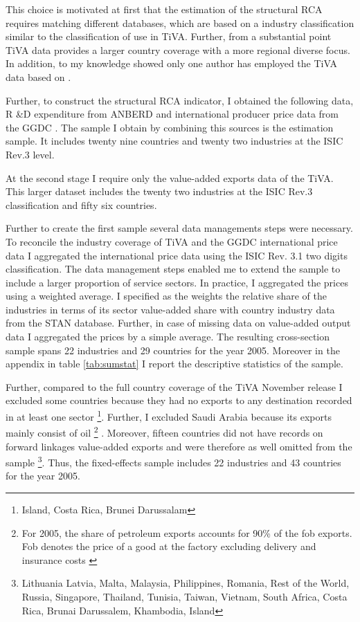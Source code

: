  This choice is motivated at first that the estimation of the structural RCA requires matching different databases, which are based on a industry classification similar to the classification of use in TiVA.
 Further, from a substantial point TiVA data provides a larger country coverage with a more regional diverse focus.
  In addition, to my knowledge showed only one author has employed the TiVA data based on \textcite{johnson}. \par
Further, to construct the structural RCA indicator, I obtained the following data, R \&D expenditure from \textcite{stan2} ANBERD and  international producer price data from the GGDC  \parencite{Inklaar2012}.
The sample I obtain by combining this sources is the estimation sample.
It includes twenty nine countries and twenty two industries at the ISIC Rev.3 level. \par
At the second stage I require only the value-added exports data of the TiVA.
This larger dataset includes the twenty two industries at the ISIC Rev.3 classification and fifty six countries.
\par
Further to create the first sample several data managements steps were necessary.
To reconcile the industry coverage of TiVA and the GGDC international price data I aggregated the international price data using the ISIC Rev. 3.1 two digits classification.
 The data management steps enabled me to extend the sample to include a larger proportion of service sectors. In practice, I aggregated  the prices using a weighted average.
  I specified as the  weights the relative share of the industries in terms of its sector value-added share with country industry data from the  \textcite{OECDSTAN} STAN database.
  Further, in case of missing data on value-added output data  I aggregated the prices by a simple average.
  The resulting cross-section sample spans 22 industries and  29 countries for the year 2005.
   Moreover in the appendix in table \ref{tab:sumstat} I report the descriptive statistics of the sample.  \par
Further, compared to the full country coverage of the TiVA November release I excluded some countries because they had no exports to any destination recorded in at least one sector \footnote{ Island, Costa Rica, Brunei Darussalam}. %
Further, I excluded Saudi Arabia because its exports mainly consist of oil \footnote{ For 2005, the share of petroleum exports accounts for  90\% of the fob exports. Fob denotes the price of a good at the factory excluding delivery and insurance costs \parencite[p.78]{combes}} \parencite{opec}.
Moreover, fifteen  countries did not have records on forward linkages value-added exports and were therefore as well omitted from the sample \footnote{Lithuania Latvia, Malta, Malaysia, Philippines, Romania, Rest of the World, Russia, Singapore, Thailand, Tunisia, Taiwan, Vietnam, South Africa, Costa Rica, Brunai Darussalem, Khambodia, Island}.
Thus, the fixed-effects sample includes 22 industries and 43 countries for the year 2005.
\endinput
